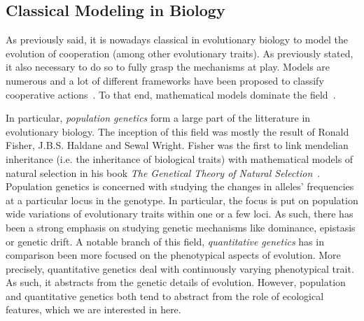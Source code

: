 

  \subsection{Classical Modeling in Biology}

    As previously said, it is nowadays classical in evolutionary biology to model the evolution of cooperation (among other evolutionary traits). As previously stated, it also necessary to do so to fully grasp the mechanisms at play.  Models are numerous and a lot of different frameworks have been proposed to classify cooperative actions~\parencite{Dugatkin2002, Sachs2004, Lehmann2006}. To that end, mathematical models dominate the field~\parencite{Servedio2014}. 

    In particular, \emph{population genetics} form a large part of the litterature in evolutionary biology. The inception of this field was mostly the result of Ronald Fisher, J.B.S. Haldane and Sewal Wright. Fisher was the first to link mendelian inheritance (i.e. the inheritance of biological traits) with mathematical models of natural selection in his book \textit{The Genetical Theory of Natural Selection}~\parencite{Fisher1930}. Population genetics is concerned with studying the changes in alleles' frequencies at a particular locus in the genotype. In particular, the focus is put on population wide variations of evolutionary traits within one or a few loci. As such, there has been a strong emphasis on studying genetic mechanisms like dominance, epistasis or genetic drift. A notable branch of this field, \emph{quantitative genetics} has in comparison been more focused on the phenotypical aspects of evolution. More precisely, quantitative genetics deal with continuously varying phenotypical trait. As such, it abstracts from the genetic details of evolution. However, population and quantitative genetics both tend to abstract from the role of ecological features, which we are interested in here.




